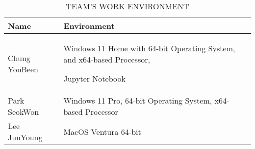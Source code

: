 \documentclass[conference]{IEEEtran}
\begin{document}
\begin{table}[ht]
\caption{TEAM’S WORK ENVIRONMENT}
\begin{tabular}{| p{2.9cm}|p{4.5cm} |}

\hline
Name & Environment \\
\hline
Chung YouBeen 
& Windows 11 Home with 64-bit Operating
System, and x64-based Processor, \par Jupyter Notebook \\

\hline

Park SeokWon 
& Windows 11 Pro, 64-bit Operating System, x64-based Processor \\

\hline
Lee JunYoung
& MacOS Ventura 64-bit
 \\
\hline
\end{tabular}
\end{table}
\end{document}
